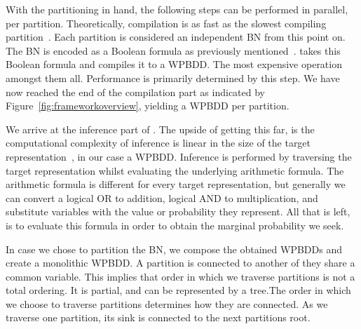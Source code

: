 With the partitioning in hand, the following steps can be performed in parallel, per partition. Theoretically, compilation is as fast as the slowest compiling partition~\cite{dal2018parallel}. Each partition is considered an independent BN from this point on. The BN is encoded as a Boolean formula as previously mentioned~\cite{chavira2008probabilistic}. \toolname takes this Boolean formula and compiles it to a WPBDD. The most expensive operation amongst them all. Performance is primarily determined by this step. We have now reached the end of the compilation part as indicated by Figure~\ref{fig:frameworkoverview}, yielding a WPBDD per partition.

We arrive at the inference part of \toolname. The upside of getting this far, is the computational complexity of inference is linear in the size of the target representation~\cite{darwiche2002knowledge}, in our case a WPBDD. Inference is performed by traversing the target representation whilst evaluating the underlying arithmetic formula. The arithmetic formula is different for every target representation, but generally we can convert a logical OR to addition, logical AND to multiplication, and substitute variables with the value or probability they represent. All that is left, is to evaluate this formula in order to obtain the marginal probability we seek.

In case we chose to partition the BN, we compose the obtained WPBDDs and create a monolithic WPBDD. A partition is connected to another of they share a common variable. This implies that order in which we traverse partitions is not a total ordering. It is partial, and can be represented by a tree.The order in which we choose to traverse partitions determines how they are connected. As we traverse one partition, its sink is connected to the next partitions root.

